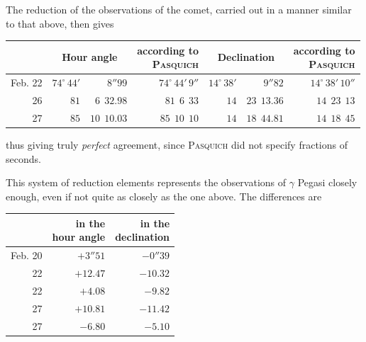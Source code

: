 The reduction of the observations of the comet, carried out in a manner
similar to that above, then gives

\begin{center}\footnotesize\setlength{\tabcolsep}{3pt}\begin{tabular}{r | r r | r | r r | r}
 & \multicolumn{2}{c|}{Hour angle} & \shortstack{according to\\\textsc{Pasquich}} & \multicolumn{2}{c|}{Declination} & \shortstack{according to\\\textsc{Pasquich}} \\
\hline
Feb. 22 & $74^\circ\,44'$ & $8''99$ & $74^\circ\,44'\,9''$ & $14^\circ\,38'$ & $9''82$ & $14^\circ\,38'\,10''$ \\
26 & $81$ & $6\ \ 32.98$ & $81\ \ 6\ \ 33$ & $14$ & $23\ \ 13.36$ & $14\ \ 23\ \ 13$ \\
27 & $85$ & $10\ \ 10.03$ & $85\ \ 10\ \ 10$ & $14$ & $18\ \ 44.81$ & $14\ \ 18\ \ 45$ \\
\end{tabular}\end{center}

thus giving truly \emph{perfect} agreement, since \textsc{Pasquich} did not
specify fractions of seconds.

This system of reduction elements represents the observations of $\gamma$ Pegasi
closely enough, even if not quite as closely as the one above. The differences are

\begin{center}\footnotesize\setlength{\tabcolsep}{4pt}\begin{tabular}{r | r | r}
 & \shortstack{in the\\hour angle} & \shortstack{in the\\declination} \\
\hline
Feb. 20 & $+3''51$ & $-0''39$ \\
22 & $+12.47$ & $-10.32$ \\
22 & $+4.08$ & $-9.82$ \\
27 & $+10.81$ & $-11.42$ \\
27 & $-6.80$ & $-5.10$ \\
\end{tabular}\end{center}

